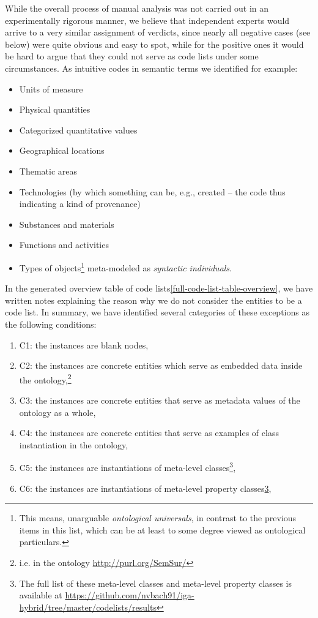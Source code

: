 While the overall process of manual analysis was not carried out in an experimentally rigorous manner, we believe that independent experts would arrive to a very similar assignment of verdicts, since nearly all negative cases (see below) were quite obvious and easy to spot, while for the positive ones it would be hard to argue that they could not serve as code lists under some circumstances.
As intuitive codes in semantic terms we identified for example:
\begin{itemize}
    \item Units of measure
    \item Physical quantities
    \item Categorized quantitative values
    \item Geographical locations
    \item Thematic areas
    \item Technologies (by which something can be, e.g., created -- the code thus indicating a kind of provenance)
    \item Substances and materials
    \item Functions and activities
    \item Types of objects\footnote{This means, unarguable  \emph{ontological universals}, in contrast to the previous items in this list, which can be at least to some degree viewed as ontological particulars.} meta-modeled as \emph{syntactic individuals}.
\end{itemize}

In the generated overview table of code lists\cref{full-code-list-table-overview}, we have written notes explaining the reason why we do not consider the entities to be a code list. In summary, we have identified several categories of these exceptions as the following conditions:

\begin{enumerate}
    \item C1: the instances are blank nodes, 
    \item C2: the instances are concrete entities which serve as embedded data inside the ontology,\footnote{\label{semsur-vocab}i.e. in the ontology \url{http://purl.org/SemSur/}}
    \item C3: the instances are concrete entities that serve as metadata values of the ontology as a whole,
    \item C4: the instances are concrete entities that serve as examples of class instantiation in the ontology,
    \item C5: the instances are instantiations of meta-level classes\footnote{\label{meta-level-classes}The full list of these meta-level classes and meta-level property classes is available at \url{https://github.com/nvbach91/iga-hybrid/tree/master/codelists/results}},
    \item C6: the instances are instantiations of meta-level property classes\cref{meta-level-classes},
\end{enumerate}

